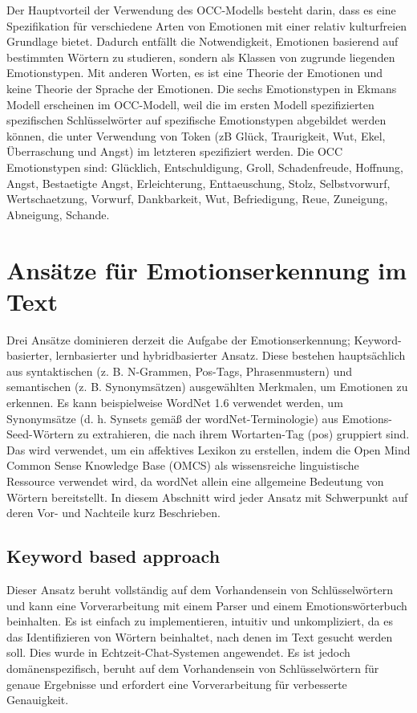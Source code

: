 \documentclass[conference]{IEEEtran}
\begin{document}
Der Hauptvorteil der Verwendung des OCC-Modells besteht darin, dass es eine Spezifikation für verschiedene Arten von Emotionen mit einer relativ kulturfreien Grundlage bietet. Dadurch entfällt die Notwendigkeit, Emotionen basierend auf bestimmten Wörtern zu studieren, sondern als Klassen von zugrunde liegenden Emotionstypen. Mit anderen Worten, es ist eine Theorie der Emotionen
und keine Theorie der Sprache der Emotionen. Die sechs Emotionstypen in Ekmans Modell erscheinen im OCC-Modell, weil die im ersten Modell spezifizierten spezifischen Schlüsselwörter auf spezifische Emotionstypen abgebildet werden können, die unter Verwendung von Token (zB Glück, Traurigkeit, Wut, Ekel, Überraschung und Angst) im letzteren spezifiziert werden. Die OCC
Emotionstypen sind: Glücklich, Entschuldigung, Groll, Schadenfreude, Hoffnung, Angst, Bestaetigte Angst, Erleichterung, Enttaeuschung, Stolz, Selbstvorwurf, Wertschaetzung, Vorwurf, Dankbarkeit, Wut, Befriedigung, Reue, Zuneigung, Abneigung, Schande.\cite{b2}

\section{Ansätze für Emotionserkennung im Text}
Drei Ansätze dominieren derzeit die Aufgabe der Emotionserkennung; Keyword-basierter, lernbasierter und hybridbasierter Ansatz. Diese bestehen hauptsächlich aus syntaktischen (z. B. N-Grammen, Pos-Tags, Phrasenmustern) und semantischen (z. B. Synonymsätzen) ausgewählten Merkmalen, um Emotionen zu erkennen. Es kann beispielweise WordNet 1.6 verwendet werden, um
Synonymsätze (d. h. Synsets gemäß der wordNet-Terminologie) aus Emotions-Seed-Wörtern zu extrahieren, die nach ihrem Wortarten-Tag (pos) gruppiert sind. Das wird verwendet, um ein affektives Lexikon zu erstellen, indem die Open Mind Common Sense Knowledge Base (OMCS) als wissensreiche linguistische Ressource verwendet wird, da wordNet allein eine allgemeine
Bedeutung von Wörtern bereitstellt. In diesem Abschnitt wird jeder Ansatz mit Schwerpunkt auf deren Vor- und Nachteile kurz Beschrieben.\cite{b2}


\subsection{Keyword based approach}
Dieser Ansatz beruht vollständig auf dem Vorhandensein von Schlüsselwörtern und kann eine Vorverarbeitung mit einem Parser und einem Emotionswörterbuch beinhalten. Es ist einfach zu implementieren, intuitiv und unkompliziert, da es das Identifizieren von Wörtern beinhaltet, nach denen im Text gesucht werden soll. Dies wurde in Echtzeit-Chat-Systemen angewendet. Es ist jedoch domänenspezifisch, beruht auf dem Vorhandensein von Schlüsselwörtern für genaue Ergebnisse und erfordert eine Vorverarbeitung für verbesserte Genauigkeit.\cite{b2}
\end{document}

